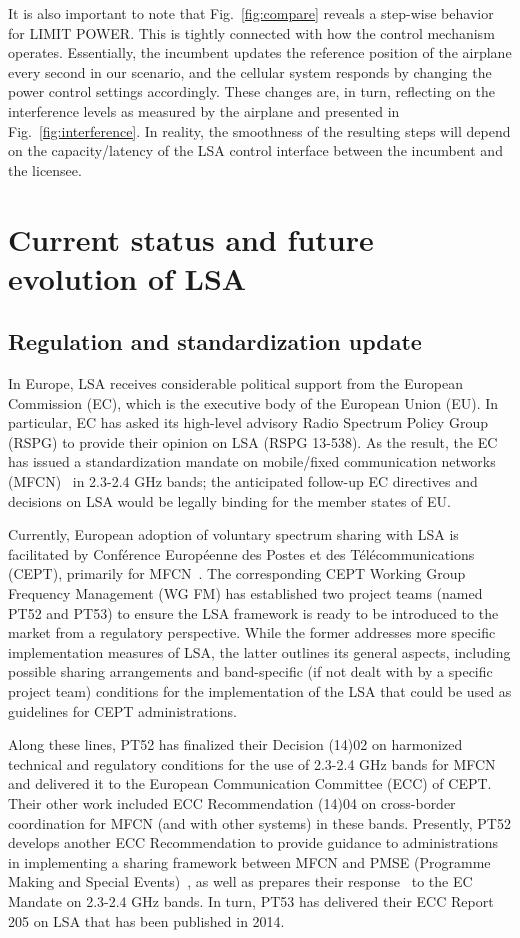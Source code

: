 \documentclass[journal]{IEEEtran}
\begin{document}
It is also important to note that Fig.~\ref{fig:compare} reveals a step-wise behavior for LIMIT POWER. This is tightly connected with how the control mechanism operates. Essentially, the incumbent updates the reference position of the airplane every second in our scenario, and the cellular system responds by changing the power control settings accordingly. These changes are, in turn, reflecting on the interference levels as measured by the airplane and presented in Fig.~\ref{fig:interference}. In reality, the smoothness of the resulting steps will depend on the capacity/latency of the LSA control interface between the incumbent and the licensee.


\section{Current status and future evolution of LSA}

\subsection{Regulation and standardization update}

In Europe, LSA receives considerable political support from the European Commission (EC), which is the executive body of the European Union (EU). In particular, EC has asked its high-level advisory Radio Spectrum Policy Group (RSPG) to provide their opinion on LSA (RSPG 13-538). As the result, the EC has issued a standardization mandate on mobile/fixed communication networks (MFCN)~\cite{EC} in 2.3-2.4 GHz bands; the anticipated follow-up EC directives and decisions on LSA would be legally binding for the  member states of EU. 

Currently, European adoption of voluntary spectrum sharing with LSA is facilitated by Conf\'{e}rence Europ\'{e}enne des Postes et des T\'{e}l\'{e}communications (CEPT), primarily for MFCN~\cite{Gun14}. The corresponding CEPT Working Group Frequency Management (WG FM) has established two project teams (named PT52 and PT53) to ensure the LSA framework is ready to be introduced to the market from a regulatory perspective. While the former addresses more specific implementation measures of LSA, the latter outlines its general aspects, including possible sharing arrangements and band-specific (if not dealt with by a specific project team) conditions for the implementation of the LSA that could be used as guidelines for CEPT administrations. 

Along these lines, PT52 has finalized their Decision (14)02 on harmonized technical and regulatory conditions for the use of 2.3-2.4 GHz bands for MFCN and delivered it to the European Communication Committee (ECC) of CEPT. Their other work included ECC Recommendation (14)04 on cross-border coordination for MFCN (and with other systems) in these bands. Presently, PT52 develops another ECC Recommendation to provide guidance to administrations in implementing a sharing framework between MFCN and PMSE (Programme Making and Special Events)~\cite{Rec1}, as well as prepares their response~\cite{Rec2} to the EC Mandate on 2.3-2.4 GHz bands. In turn, PT53 has delivered their ECC Report 205 on LSA that has been published in 2014.
\end{document}

